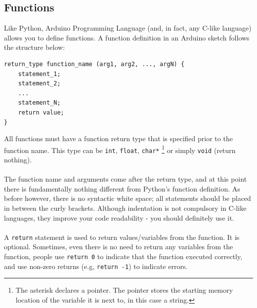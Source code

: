 \documentclass{article}
\begin{document}
\subsection{Functions}
Like Python, Arduino Programming Language (and, in fact, any C-like language) allows you to define functions. A function definition in an Arduino sketch follows the structure below:
\begin{lstlisting}
return_type function_name (arg1, arg2, ..., argN) {
    statement_1;
    statement_2;
    ...
    statement_N;
    return value;
}
\end{lstlisting}
\vspace{-.5cm}
All functions must have a function return type that is specified prior to the function name. This type can be \texttt{int}, \texttt{float}, \texttt{char*} \footnote{The asterisk declares a pointer. The pointer stores the starting memory location of the variable it is next to, in this case a string.} or simply \texttt{void} (return nothing). \\\\The function name and arguments come after the return type, and at this point there is fundamentally nothing different from Python's function definition. As before however, there is no syntactic white space; all statements should be placed in between the curly brackets. Although indentation is not compulsory in C-like languages, they improve your code readability - you should definitely use it.\\\\ A \texttt{return} statement is used to return values/variables from the function. It is optional. Sometimes, even there is no need to return any variables from the function, people use  \texttt{return 0} to indicate that the function executed correctly, and use non-zero returns (e.g, \texttt{return -1}) to indicate errors.


\newpage
\end{document}
